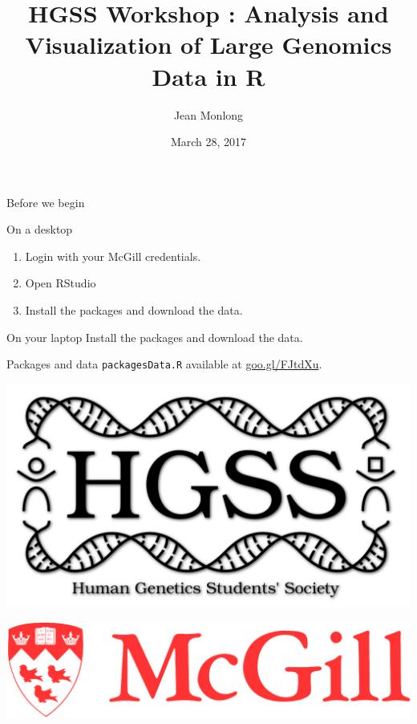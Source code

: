 \documentclass[10pt]{beamer}
\title{HGSS Workshop : Analysis and Visualization of Large Genomics Data in R}
\author{Jean Monlong}
\institute{Human Genetics department}
\date{March 28, 2017}
\begin{document}
\begin{frame}[fragile]{Before we begin}
  \begin{block}{On a desktop}
    \begin{enumerate}
    \item Login with your McGill credentials.
    \item Open RStudio
    \item Install the packages and download the data.
    \end{enumerate}
  \end{block}
  \begin{block}{On your laptop}
    Install the packages and download the data.
  \end{block}
  \begin{block}{Packages and data}
    \verb!packagesData.R! available at \url{goo.gl/FJtdXu}.
  \end{block}
\end{frame}

\begin{frame}
  \centering
  \titlepage
  \begin{minipage}{.4\textwidth}
    \includegraphics[width=.8\linewidth]{../imgs/hgssLogo-black.png}
  \end{minipage}
  \hspace{.1\textwidth}
  \begin{minipage}{.4\textwidth}
    \includegraphics[width=\linewidth]{../imgs/McGill-Logo1.png}
  \end{minipage}

\end{frame}
\end{document}

